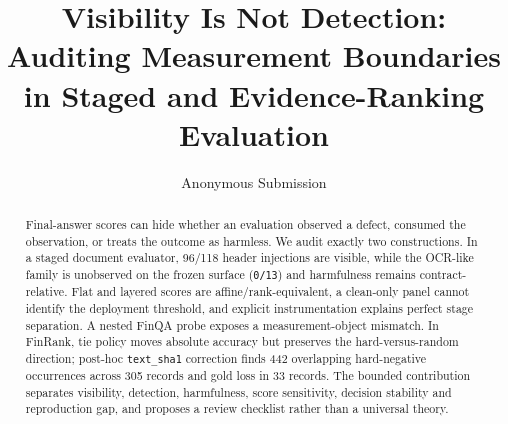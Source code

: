 \documentclass[10pt,conference]{IEEEtran}
\begin{document}
\title{Visibility Is Not Detection: Auditing Measurement Boundaries in Staged and Evidence-Ranking Evaluation}
\author{Anonymous Submission}
\maketitle
\begin{abstract}
Final-answer scores can hide whether an evaluation observed a defect, consumed the observation, or treats the outcome as harmless. We audit exactly two constructions. In a staged document evaluator, 96/118 header injections are visible, while the OCR-like family is unobserved on the frozen surface (\texttt{0/13}) and harmfulness remains contract-relative. Flat and layered scores are affine/rank-equivalent, a clean-only panel cannot identify the deployment threshold, and explicit instrumentation explains perfect stage separation. A nested FinQA probe exposes a measurement-object mismatch. In FinRank, tie policy moves absolute accuracy but preserves the hard-versus-random direction; post-hoc \texttt{text\_sha1} correction finds 442 overlapping hard-negative occurrences across 305 records and gold loss in 33 records. The bounded contribution separates visibility, detection, harmfulness, score sensitivity, decision stability and reproduction gap, and proposes a review checklist rather than a universal theory.
\end{abstract}
\end{document}
